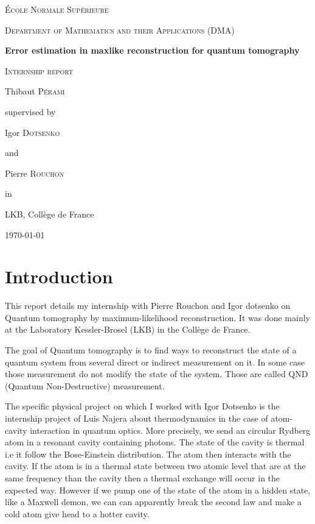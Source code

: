 \documentclass[10pt]{report}
\theoremstyle{plain}
\theoremstyle{definition}
\theoremstyle{remark}
\begin{document}
\begin{titlepage}
  \centering
  {\scshape\huge École Normale Supérieure \par}
  \vspace{0.3cm}
  {\scshape\Large Department of Mathematics and their Applications (DMA) \par}
  \vspace{3cm}
  {\Huge\bfseries Error estimation in maxlike reconstruction for quantum tomography \par}
  \vspace{0.5cm}
  {\scshape\Large Internship report\par}
  \vspace{3cm}
  {\LARGE Thibaut \textsc{Pérami}\par}
  \vfill
  {
    \large
    supervised by\par
    Igor \textsc{Dotsenko}\par
    and\par
    Pierre \textsc{Rouchon}\par
  in\par
  LKB, Collège de France
  }

  \vfill

  {\Large \today\par}
\end{titlepage}

\newcommand{\fset}{\ensuremath{\mathop{\text{\textquotesingle}}}}


\tableofcontents

\chapter*{Introduction}

This report details my internship with Pierre Rouchon and Igor dotsenko on
Quantum tomography by maximum-likelihood reconstruction. It was done mainly at
the Laboratory Kessler-Brosel (LKB) in the Collège de France.

The goal of Quantum tomography is to find ways to reconstruct the state of
a quantum system from several direct or indirect measurement on it. In some case
those measurement do not modify the state of the system. Those are called QND
(Quantum Non-Destructive) measurement.

The specific physical project on which I worked with Igor Dotsenko is the
internship project of Luis Najera about thermodynamics in the case of
atom-cavity interaction in quantum optics. More precisely, we send an circular
Rydberg atom in a resonant cavity containing photons. The state of the cavity is
thermal i.e it follow the Bose-Einstein distribution. The atom then interacts
with the cavity. If the atom is in a thermal state between two atomic level that
are at the same frequency than the cavity then a thermal exchange will occur in
the expected way. However if we pump one of the state of the atom in a hidden
state, like a Maxwell demon, we can can apparently break the second law and make
a cold atom give head to a hotter cavity.
\end{document}
